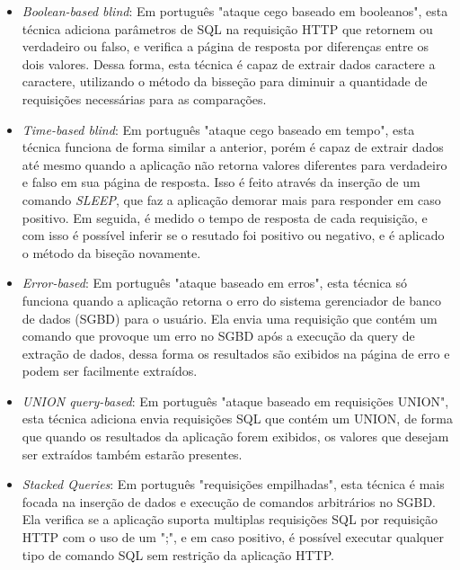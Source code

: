     \begin{itemize}
        \item \emph{Boolean-based blind}: Em português "ataque cego baseado em booleanos", esta técnica adiciona parâmetros de SQL na requisição HTTP que retornem ou verdadeiro ou falso, e verifica a página de resposta por diferenças entre os dois valores. Dessa forma, esta técnica é capaz de extrair dados caractere a caractere, utilizando o método da bisseção para diminuir a quantidade de requisições necessárias para as comparações.
        
        \item \emph{Time-based blind}: Em português "ataque cego baseado em tempo", esta técnica funciona de forma similar a anterior, porém é capaz de extrair dados até mesmo quando a aplicação não retorna valores diferentes para verdadeiro e falso em sua página de resposta. Isso é feito através da inserção de um comando \textit{SLEEP}, que faz a aplicação demorar mais para responder em caso positivo. Em seguida, é medido o tempo de resposta de cada requisição, e com isso é possível inferir se o resutado foi positivo ou negativo, e é aplicado o método da biseção novamente.
        
        \item \emph{Error-based}: Em português "ataque baseado em erros", esta técnica só funciona quando a aplicação retorna o erro do sistema gerenciador de banco de dados (SGBD) para o usuário. Ela envia uma requisição que contém um comando que provoque um erro no SGBD após a execução da query de extração de dados, dessa forma os resultados são exibidos na página de erro e podem ser facilmente extraídos.
        
        \item \emph{UNION query-based}: Em português "ataque baseado em requisições UNION", esta técnica adiciona envia requisições SQL que contém um UNION, de forma que quando os resultados da aplicação forem exibidos, os valores que desejam ser extraídos também estarão presentes. 
        
        \item \emph{Stacked Queries}: Em português "requisições empilhadas", esta técnica é mais focada na inserção de dados e execução de comandos arbitrários no SGBD. Ela verifica se a aplicação suporta multiplas requisições SQL por requisição HTTP com o uso de um ";", e em caso positivo, é possível executar qualquer tipo de comando SQL sem restrição da aplicação HTTP.
    \end{itemize}
    
